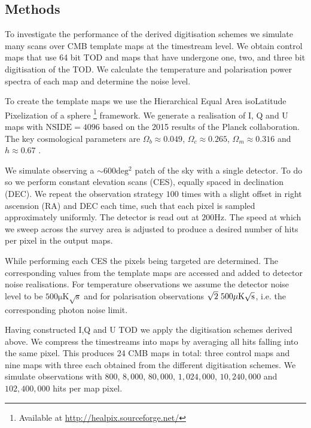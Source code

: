 \documentclass[apj]{emulateapj}
\begin{document}
\subsection{Methods}
\label{subsec:method}

To investigate the performance of the derived digitisation schemes we simulate many scans over CMB template maps at the timestream level. We obtain control maps that use 64 bit TOD and maps that have undergone one, two, and three bit digitisation of the TOD. We calculate the temperature and polarisation power spectra of each map and determine the noise level.

To create the template maps we use the Hierarchical Equal Area isoLatitude Pixelization of a sphere \citep[HEALPix;][]{healpix}\footnote{Available at \url{http://healpix.sourceforge.net/}} framework. We generate a realisation of I, Q and U maps with $\mathrm{NSIDE} = 4096$ based on the 2015 results of the Planck collaboration. The key cosmological parameters are $\Omega_b \approx 0.049 $, $\Omega_c \approx 0.265$, $\Omega_m \approx 0.316$ and $h \approx 0.67$ \citep{planck2016}.


We simulate observing a $\sim 600 \mathrm{deg^2}$ patch of the sky with a single detector. To do so we perform constant elevation scans (CES), equally spaced in declination (DEC). We repeat the observation strategy $100$ times with a slight offset in right ascension (RA) and DEC each time, such that each pixel is sampled approximately uniformly. The detector is read out at $200 \mathrm{Hz}$. The speed at which we sweep across the survey area is adjusted to produce a desired number of hits per pixel in the output maps.

While performing each CES the pixels being targeted are determined. The corresponding values from the template maps are accessed and added to detector noise realisations. For temperature observations we assume the detector noise level to be $500 \mathrm{\mu K \sqrt{s}}$ and for polarisation observations $\sqrt{2} \hspace{0.7ex} 500 \mathrm{\mu K \sqrt{s}}$, i.e. the corresponding photon noise limit.

Having constructed I,Q and U TOD we apply the digitisation schemes derived above. We compress the timestreams into maps by averaging all hits falling into the same pixel. This produces 24 CMB maps in total: three control maps and nine maps with three each obtained from the different digitisation schemes. We simulate observations with $800$, $8,000$, $80,000$, $1,024,000$, $10,240,000$ and $102,400,000$ hits per map pixel.
\end{document}
